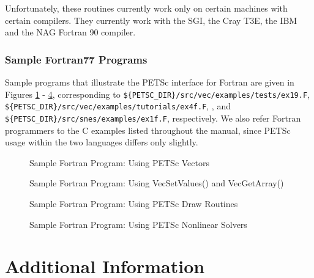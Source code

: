 {Unfortunately, these routines currently work only on certain machines with 
certain compilers. They currently work with the SGI, the Cray T3E, the
IBM and the NAG Fortran 90 compiler.

\section{Sample Fortran77 Programs}
\label{sec:fortran-examples}

Sample programs that illustrate the PETSc interface for Fortran
are given in Figures \ref{fig:vec-Fortran} - \ref{fig:SNES-Fortran},
corresponding to
{\tt \$\{PETSC\_DIR\}/src/vec/examples/tests/ex19.F}, 
{\tt \$\{PETSC\_DIR\}/src/vec/examples/tutorials/ex4f.F}, 
, and 
{\tt \$\{PETSC\_DIR\}/src/snes/examples/ex1f.F}, respectively.  We also
refer Fortran programmers to the C examples listed throughout the manual,
since PETSc usage within the two languages differs only slightly.

\begin{figure}[H]
{\small
{}
}
\caption{Sample Fortran Program:  Using PETSc Vectors}
\label{fig:vec-Fortran}
\end{figure}

\begin{figure}[H]
{\small
{}
}
\caption{Sample Fortran Program:  Using VecSetValues() and VecGetArray()}
\label{fig:vec2-Fortran}
\end{figure}

\begin{figure}[H]
{\small
{}
}
\caption{Sample Fortran Program:  Using PETSc Draw Routines}
\label{fig:draw-Fortran}
\end{figure}

\begin{figure}[H]
{\small
{}
}
\caption{Sample Fortran Program:  Using PETSc Nonlinear Solvers}
\label{fig:SNES-Fortran}
\end{figure}

\part{Additional Information}
\label{part:usefulstuff}

}
